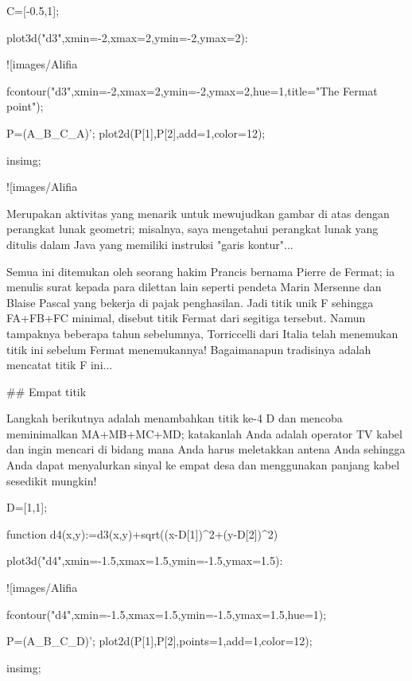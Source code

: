 \documentclass{article}
\begin{document}
\>C=[-0.5,1];

\>plot3d("d3",xmin=-2,xmax=2,ymin=-2,ymax=2):


![images/Alifia%

\>fcontour("d3",xmin=-2,xmax=2,ymin=-2,ymax=2,hue=1,title="The Fermat point");

\>P=(A\_B\_C\_A)'; plot2d(P[1],P[2],add=1,color=12);

\>insimg;


![images/Alifia%

Merupakan aktivitas yang menarik untuk mewujudkan gambar di atas
dengan perangkat lunak geometri; misalnya, saya mengetahui perangkat
lunak yang ditulis dalam Java yang memiliki instruksi "garis
kontur"...


Semua ini ditemukan oleh seorang hakim Prancis bernama Pierre de
Fermat; ia menulis surat kepada para dilettan lain seperti pendeta
Marin Mersenne dan Blaise Pascal yang bekerja di pajak penghasilan.
Jadi titik unik F sehingga FA+FB+FC minimal, disebut titik Fermat dari
segitiga tersebut. Namun tampaknya beberapa tahun sebelumnya,
Torriccelli dari Italia telah menemukan titik ini sebelum Fermat
menemukannya! Bagaimanapun tradisinya adalah mencatat titik F ini...


## Empat titik

Langkah berikutnya adalah menambahkan titik ke-4 D dan mencoba
meminimalkan MA+MB+MC+MD; katakanlah Anda adalah operator TV kabel dan
ingin mencari di bidang mana Anda harus meletakkan antena Anda
sehingga Anda dapat menyalurkan sinyal ke empat desa dan menggunakan
panjang kabel sesedikit mungkin!


\>D=[1,1];

\>function d4(x,y):=d3(x,y)+sqrt((x-D[1])^2+(y-D[2])^2)

\>plot3d("d4",xmin=-1.5,xmax=1.5,ymin=-1.5,ymax=1.5):


![images/Alifia%

\>fcontour("d4",xmin=-1.5,xmax=1.5,ymin=-1.5,ymax=1.5,hue=1);

\>P=(A\_B\_C\_D)'; plot2d(P[1],P[2],points=1,add=1,color=12);

\>insimg;
\end{document}
